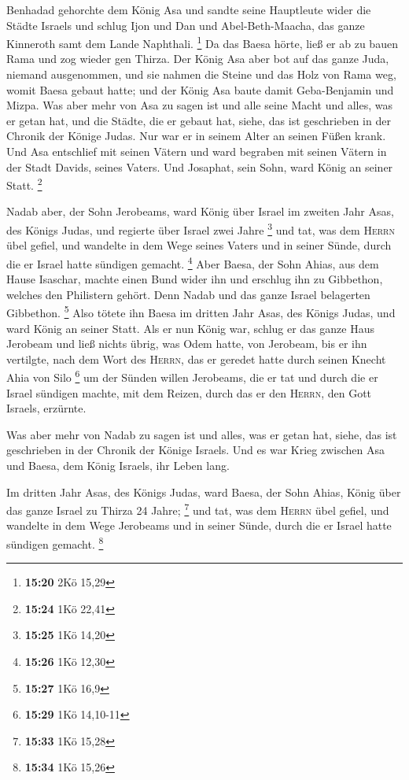  Benhadad gehorchte dem König Asa und sandte seine
Hauptleute wider die Städte Israels und schlug Ijon und Dan und
Abel-Beth-Maacha, das ganze Kinneroth samt dem Lande Naphthali.
\footnote{\textbf{15:20} 2Kö 15,29}  Da das Baesa hörte,
ließ er ab zu bauen Rama und zog wieder gen Thirza.  Der
König Asa aber bot auf das ganze Juda, niemand ausgenommen, und sie
nahmen die Steine und das Holz von Rama weg, womit Baesa gebaut hatte;
und der König Asa baute damit Geba-Benjamin und Mizpa. 
Was aber mehr von Asa zu sagen ist und alle seine Macht und alles, was
er getan hat, und die Städte, die er gebaut hat, siehe, das ist
geschrieben in der Chronik der Könige Judas. Nur war er in seinem Alter
an seinen Füßen krank.  Und Asa entschlief mit seinen
Vätern und ward begraben mit seinen Vätern in der Stadt Davids, seines
Vaters. Und Josaphat, sein Sohn, ward König an seiner Statt. \footnote{\textbf{15:24}
  1Kö 22,41}

 Nadab aber, der Sohn Jerobeams, ward König über Israel
im zweiten Jahr Asas, des Königs Judas, und regierte über Israel zwei
Jahre \footnote{\textbf{15:25} 1Kö 14,20}  und tat, was
dem \textsc{Herrn} übel gefiel, und wandelte in dem Wege seines Vaters
und in seiner Sünde, durch die er Israel hatte sündigen gemacht.
\footnote{\textbf{15:26} 1Kö 12,30}  Aber Baesa, der Sohn
Ahias, aus dem Hause Isaschar, machte einen Bund wider ihn und erschlug
ihn zu Gibbethon, welches den Philistern gehört. Denn Nadab und das
ganze Israel belagerten Gibbethon. \footnote{\textbf{15:27} 1Kö 16,9}
 Also tötete ihn Baesa im dritten Jahr Asas, des Königs
Judas, und ward König an seiner Statt.  Als er nun König
war, schlug er das ganze Haus Jerobeam und ließ nichts übrig, was Odem
hatte, von Jerobeam, bis er ihn vertilgte, nach dem Wort des
\textsc{Herrn}, das er geredet hatte durch seinen Knecht Ahia von Silo
\footnote{\textbf{15:29} 1Kö 14,10-11}  um der Sünden
willen Jerobeams, die er tat und durch die er Israel sündigen machte,
mit dem Reizen, durch das er den \textsc{Herrn}, den Gott Israels,
erzürnte.

 Was aber mehr von Nadab zu sagen ist und alles, was er
getan hat, siehe, das ist geschrieben in der Chronik der Könige Israels.
 Und es war Krieg zwischen Asa und Baesa, dem König
Israels, ihr Leben lang.

 Im dritten Jahr Asas, des Königs Judas, ward Baesa, der
Sohn Ahias, König über das ganze Israel zu Thirza 24 Jahre; \footnote{\textbf{15:33}
  1Kö 15,28}  und tat, was dem \textsc{Herrn} übel
gefiel, und wandelte in dem Wege Jerobeams und in seiner Sünde, durch
die er Israel hatte sündigen gemacht. \footnote{\textbf{15:34} 1Kö 15,26}


